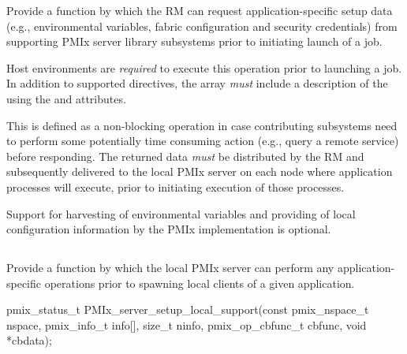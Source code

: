 \optattrend

\descr

Provide a function by which the \ac{RM} can request application-specific setup data (e.g., environmental variables, fabric configuration and security credentials) from supporting \ac{PMIx} server library subsystems prior to initiating launch of a job.

\advicermstart
Host environments are \textit{required} to execute this operation prior to launching a job. In addition to supported directives, the  array \emph{must} include a description of the  using the  and  attributes.
\advicermend

This is defined as a non-blocking operation in case contributing subsystems need to perform some potentially time consuming action (e.g., query a remote service) before responding. The returned data \emph{must} be distributed by the \ac{RM} and subsequently delivered to the local \ac{PMIx} server on each node where application processes will execute, prior to initiating execution of those processes.

\adviceimplstart
Support for harvesting of environmental variables and providing of local configuration information by the \ac{PMIx} implementation is optional.
\adviceimplend

\subsection{}

\summary

Provide a function by which the local \ac{PMIx} server can perform any application-specific operations prior to spawning local clients of a given application.

\format

\cspecificstart
\begin{codepar}
pmix_status_t
PMIx_server_setup_local_support(const pmix_nspace_t nspace,
                                pmix_info_t info[], size_t ninfo,
                                pmix_op_cbfunc_t cbfunc,
                                void *cbdata);
\end{codepar}
\cspecificend

\begin{arglist}
\end{arglist}

